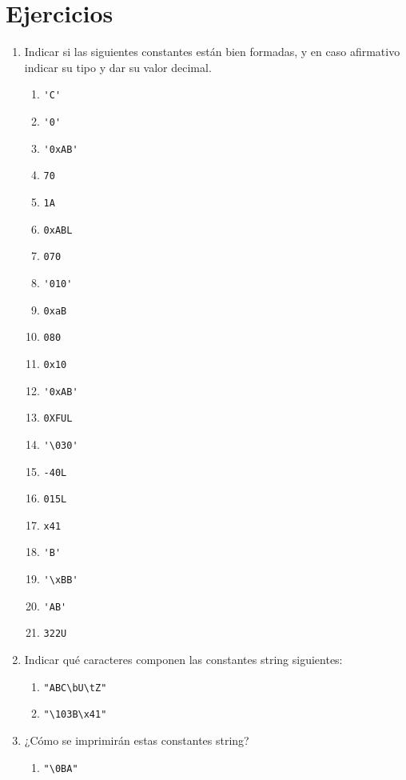\section{Ejercicios}
\begin{enumerate}
	\item Indicar si las siguientes constantes están bien formadas, y en caso afirmativo indicar su tipo y dar su
valor decimal.
		\begin{multicols}{4}
		\begin{enumerate}[label=\alph*.]
\item \lstinline{'C'} 
\item \lstinline{'0'}
\item \lstinline{'0xAB'}
\item \lstinline{70}
\item \lstinline{1A}
\item \lstinline{0xABL}
\item \lstinline{070} 
\item \lstinline{'010'} 
\item \lstinline{0xaB}
\item \lstinline{080}
\item \lstinline{0x10} 
\item \lstinline{'0xAB'}
\item \lstinline{0XFUL}
\item \lstinline{'\030'} 
\item \lstinline{-40L}
\item \lstinline{015L}
\item \lstinline{x41}
\item \lstinline{'B'}
\item \lstinline{'\xBB'} 
\item \lstinline{'AB'}
\item \lstinline{322U}
	\end{enumerate}
	\end{multicols}
\item Indicar qué caracteres componen las constantes string siguientes:
		\begin{enumerate}[label=\alph*.]
\item \lstinline{"ABC\bU\tZ"}
\item \lstinline{"\103B\x41"}
	\end{enumerate}
\item ¿Cómo se imprimirán estas constantes string?
		\begin{enumerate}[label=\alph*.]
\item \lstinline{"\0BA"}

\end{enumerate}
\end{enumerate}

